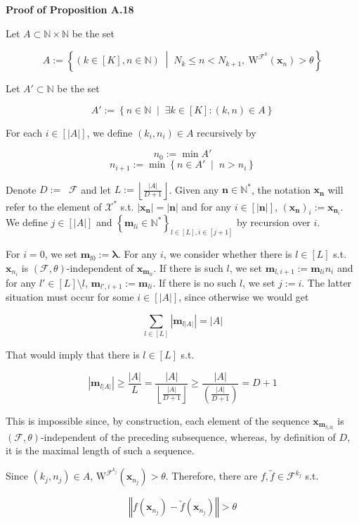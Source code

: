 \documentclass[a4paper]{article}
\newcommand{\Co}[1]{}
\newcommand{\AP}[1]{\left(#1\right)}
\newcommand{\AB}[1]{\left[#1\right]}
\newcommand{\AC}[1]{\left\{#1\right\}}
\newcommand{\ACM}[2]{\left\{#1\;\middle\vert\;#2\right\}}
\newcommand{\Abs}[1]{\left\vert #1 \right\vert}
\newcommand{\Norm}[1]{\left\Vert #1 \right\Vert}
\newcommand{\Floor}[1]{\left\lfloor #1 \right\rfloor}
\newcommand{\Nats}{\mathbb{N}}
\newcommand{\Estr}{\boldsymbol{\lambda}} %
\DeclareMathOperator{\RVO}{\dim_{RVO}}
\newcommand{\X}{\mathcal{X}}
\newcommand{\F}{\mathcal{F}}
\newcommand{\W}{\mathrm{W}}
\begin{document}
\textbf{Proof of Proposition A.18}\Co{b}

Let $A\subset\Nats\times\Nats$ be the set

$$A:=\ACM{\AP{k\in[K],n\in\Nats}}{N_k\leq n<N_{k+1},\ \W^{\F^{k}}\AP{\boldsymbol{x}_{n}}>\theta}$$

Let $A'\subset\Nats$ be the set

$$A':=\ACM{n\in\Nats}{\exists k\in[K]:(k,n)\in A}$$

For each $i\in\AB{\Abs{A}}$, we define $\AP{k_i,n_i}\in A$ recursively by

$$n_0:=\min A'$$
$$n_{i+1}:=\min\ACM{n\in A'}{n > n_i}$$

Denote $D:=\RVO{\F}$ and let $L:=\Floor{\frac{\Abs{A}}{D+1}}$. Given any $\boldsymbol{n}\in\Nats^*$, the notation $\boldsymbol{x}_{\boldsymbol{n}}$ will refer to the element of $\X^*$ s.t. $\Abs{\boldsymbol{x}_{\boldsymbol{n}}}=\Abs{\boldsymbol{n}}$ and for any $i\in\AB{\Abs{\boldsymbol{n}}}$, $\AP{\boldsymbol{x}_{\boldsymbol{n}}}_i:=\boldsymbol{x}_{\boldsymbol{n}_i}$. We define $j\in\AB{\Abs{A}}$ and $\AC{\boldsymbol{m}_{li}\in \Nats^*}_{l\in[L],i\in\AB{j+1}}$ by recursion over $i$.

For $i=0$, we set $\boldsymbol{m}_{l0}:=\Estr$. For any $i$, we consider whether there is $l\in[L]$ s.t. $\boldsymbol{x}_{n_i}$ is $(\F,\theta)$-independent of $\boldsymbol{x}_{\boldsymbol{m}_{li}}$. If there is such $l$, we set $\boldsymbol{m}_{l,i+1}:=\boldsymbol{m}_{li}{n_i}$ and for any $l'\in[L]\setminus l$, $\boldsymbol{m}_{l',i+1}:=\boldsymbol{m}_{li}$. If there is no such $l$, we set $j:=i$. The latter situation must occur for some $i\in\AB{\Abs{A}}$, since otherwise we would get

$$\sum_{l\in[L]}\Abs{\boldsymbol{m}_{l\Abs{A}}}=\Abs{A}$$

That would imply that there is $l\in[L]$ s.t.

$$\Abs{\boldsymbol{m}_{l\Abs{A}}}\geq\frac{\Abs{A}}{L}=\frac{\Abs{A}}{\Floor{\frac{\Abs{A}}{D+1}}}\geq\frac{\Abs{A}}{\AP{\frac{\Abs{A}}{D+1}}}=D+1$$

This is impossible since, by construction, each element of the sequence $\boldsymbol{x}_{\boldsymbol{m}_{l\Abs{A}}}$ is $(\F,\theta)$-independent of the preceding subsequence, whereas, by definition of $D$, it is the maximal length of such a sequence.

Since $(k_j,n_j)\in A$, $\W^{\F^{k_j}}\AP{\boldsymbol{x}_{n_j}}>\theta$. Therefore, there are $f,\tilde{f}\in\F^{k_j}$ s.t. 

$$\Norm{f\AP{\boldsymbol{x}_{n_j}}-\tilde{f}\AP{\boldsymbol{x}_{n_j}}}>\theta$$
\end{document}
